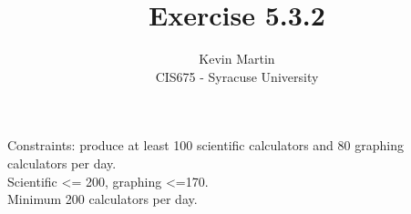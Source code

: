 \documentclass{article}
\author{Kevin Martin\\ CIS675 - Syracuse University}
\title{Exercise 5.3.2}
\begin{document}
\maketitle
Constraints: produce at least 100 scientific calculators and 80
graphing calculators per day. \\
Scientific <= 200, graphing <=170.\\
Minimum 200 calculators per day.
\end{document}
